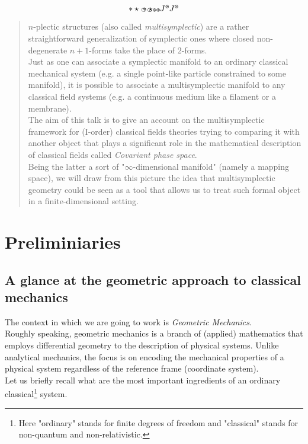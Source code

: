$$
\ast 
\star 
\oast 
\ostar
\smoast
\smostar
J^\smostar
J^\smoast
$$


\begin{abstract}
$n$-plectic structures (also called \emph{multisymplectic}) are a rather straightforward generalization of symplectic ones where closed non-degenerate $n+1$-forms take the place of  $2$-forms.
\\
Just as one can associate a symplectic manifold to an ordinary classical mechanical system (e.g. a single point-like particle constrained to some manifold), it is possible to associate a multisymplectic manifold to any classical field systems (e.g. a continuous medium like a filament or a membrane).
\\
The aim of this talk is to give an account on the multisymplectic framework for (I-order) classical fields theories trying to comparing it with another object that plays a significant role in the mathematical description of classical fields called \emph{Covariant phase space}.
\\
Being the latter a sort of "$\infty$-dimensional manifold" (namely a mapping space), we will draw from this picture the idea that multisymplectic geometry could be seen as a tool that allows us to treat such formal object in a finite-dimensional setting.


\end{abstract}


\section{Preliminiaries}

\subsection{A glance at the geometric approach to classical mechanics}
The context in which we are going to work is \emph{Geometric Mechanics}.
\\
Roughly speaking, geometric mechanics is a branch of (applied) mathematics that employs differential geometry to the description of physical systems. Unlike analytical mechanics, the focus is on encoding the mechanical properties of a physical system regardless of the reference frame (coordinate system).
\\
Let us briefly recall what are the most important ingredients of an ordinary classical\footnote{Here "ordinary" stands for finite degrees of freedom and "classical" stands for non-quantum and non-relativistic.} system.

